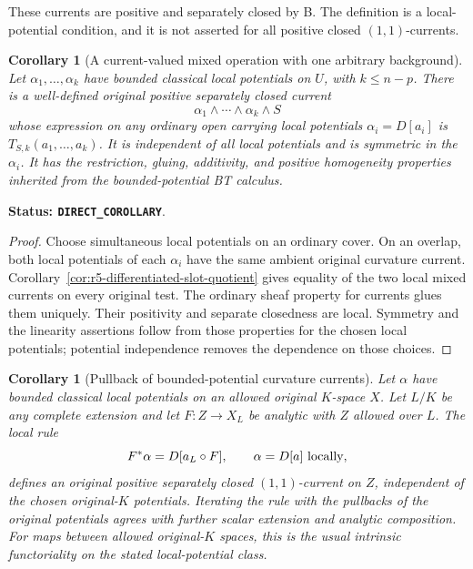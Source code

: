 \documentclass[11pt,a4paper]{article}
\numberwithin{equation}{section}
\newtheorem{corollary}[theorem]{Corollary}
\theoremstyle{definition}
\theoremstyle{remark}
\begin{document}
These currents are positive and separately closed by B.
The definition is a local-potential condition, and it is not
asserted for all positive closed $(1,1)$-currents.

\begin{corollary}[A current-valued mixed operation with one arbitrary background]
\label{cor:r5-local-potential-current-products}
Let $\alpha_1,\ldots,\alpha_k$ have bounded classical local
potentials on $U$, with $k\leq n-p$. There is a well-defined
original positive separately closed current
\[
                        \alpha_1\wedge\cdots\wedge\alpha_k\wedge S
\]
whose expression on any ordinary open carrying local potentials
$\alpha_i=D[a_i]$ is $T_{S,k}(a_1,\ldots,a_k)$.
It is independent of all local potentials and is symmetric
in the $\alpha_i$. It has the restriction, gluing, additivity,
and positive homogeneity properties inherited from the
bounded-potential BT calculus.
\end{corollary}

\noindent\textbf{Status: \texttt{DIRECT\_COROLLARY}}.

\begin{proof}
Choose simultaneous local potentials on an ordinary cover.
On an overlap, both local potentials of each $\alpha_i$
have the same ambient original curvature current.
Corollary~\ref{cor:r5-differentiated-slot-quotient} gives equality
of the two local mixed currents on every original test.
The ordinary sheaf property for currents glues them uniquely.
Their positivity and separate closedness are local.
Symmetry and the linearity assertions follow from those
properties for the chosen local potentials; potential
independence removes the dependence on those choices.
\end{proof}

\begin{corollary}[Pullback of bounded-potential curvature currents]
\label{cor:r5-potential-current-pullback}
Let $\alpha$ have bounded classical local potentials on an
allowed original $K$-space $X$. Let $L/K$ be any complete
extension and let $F:Z\to X_L$ be analytic with $Z$ allowed
over $L$. The local rule
\[
                      F^*\alpha=D[a_L\circ F],
                \qquad \alpha=D[a]\ \hbox{locally},
\]
defines an original positive separately closed $(1,1)$-current
on $Z$, independent of the chosen original-$K$ potentials.
Iterating the rule with the pullbacks of the original potentials
agrees with further scalar extension and analytic composition.
For maps between allowed original-$K$ spaces, this is the usual
intrinsic functoriality on the stated local-potential class.
\end{corollary}
\end{document}

